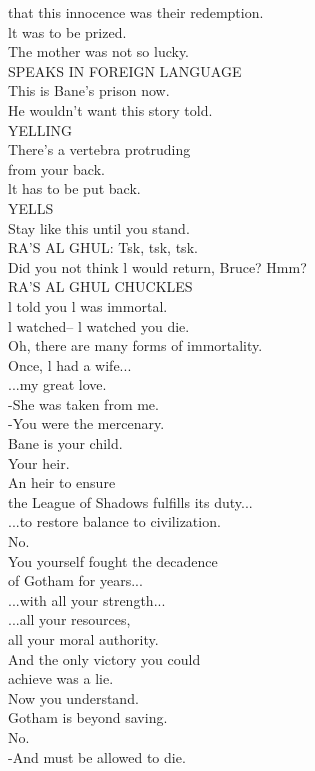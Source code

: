 \documentclass{article}
\begin{document}
\begin{multicols}{3}
that this innocence was their redemption.\\
lt was to be prized.\\
The mother was not so lucky.\\
SPEAKS IN FOREIGN LANGUAGE\\
This is Bane's prison now.\\
He wouldn't want this story told.\\
YELLING\\
There's a vertebra protruding\\
from your back.\\
lt has to be put back.\\
YELLS\\
Stay like this until you stand.\\
RA'S AL GHUL: Tsk, tsk, tsk.\\
Did you not think l would return, Bruce? Hmm?\\
RA'S AL GHUL CHUCKLES\\
l told you l was immortal.\\
l watched-- l watched you die.\\
Oh, there are many forms of immortality.\\
Once, l had a wife...\\
...my great love.\\
-She was taken from me.\\
-You were the mercenary.\\
Bane is your child.\\
Your heir.\\
An heir to ensure\\
the League of Shadows fulfills its duty...\\
...to restore balance to civilization.\\
No.\\
You yourself fought the decadence\\
of Gotham for years...\\
...with all your strength...\\
...all your resources,\\
all your moral authority.\\
And the only victory you could\\
achieve was a lie.\\
Now you understand.\\
Gotham is beyond saving.\\
No.\\
-And must be allowed to die.\\

\end{multicols}
\end{document}
